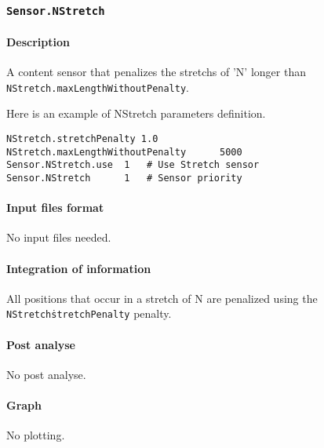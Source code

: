 
\subsubsection{\texttt{Sensor.NStretch}}

\paragraph{Description}

A content sensor that penalizes the stretchs of 'N' longer than \texttt{NStretch\-.maxLengthWithoutPenalty}.

Here is an example of NStretch parameters definition.
\begin{Verbatim}[fontsize=\small]
NStretch.stretchPenalty 1.0
NStretch.maxLengthWithoutPenalty      5000
Sensor.NStretch.use  1   # Use Stretch sensor
Sensor.NStretch      1   # Sensor priority
\end{Verbatim}

\paragraph{Input files format}

No input files  needed.

\paragraph{Integration of information}

All positions that occur in a stretch of N are penalized using the \texttt{NStretch\.stretchPenalty} penalty.

\paragraph{Post analyse}

No post analyse.

\paragraph{Graph}

No plotting.

